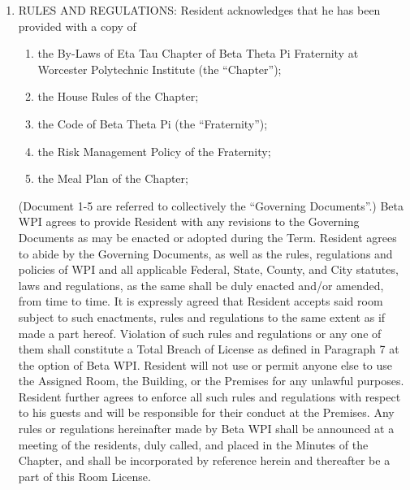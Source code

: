 \documentclass[legalpaper, 12pt]{article}
\begin{document}
\begin{enumerate}
\begin{enumerate}[label=\Alph*.]
                \end{enumerate}

        \item RULES AND REGULATIONS\@: Resident acknowledges that he has been
                provided with a copy of 

        \begin{enumerate}[label=\arabic*)]

                \item the By-Laws of Eta Tau Chapter of Beta Theta Pi Fraternity
                        at Worcester Polytechnic Institute (the ``Chapter''); 

                \item the House Rules of the Chapter; 

                \item the Code of Beta Theta Pi (the ``Fraternity'');

                \item the Risk Management Policy of the Fraternity;

                \item the Meal Plan of the Chapter;

        \end{enumerate}

                (Document 1-5 are referred to collectively the ``Governing
                Documents''.) Beta WPI agrees to provide Resident with any
                revisions to the Governing Documents as may be enacted or
                adopted during the Term.  Resident agrees to abide by the
                Governing Documents, as well as the rules, regulations and
                policies of WPI and all applicable Federal, State, County, and
                City statutes, laws and regulations, as the same shall be duly
                enacted and/or amended, from time to time.  It is expressly
                agreed that Resident accepts said room subject to such
                enactments, rules and regulations to the same extent as if made
                a part hereof.  Violation of such rules and regulations or any
                one of them shall constitute a Total Breach of License as
                defined in Paragraph 7 at the option of Beta WPI\@.  Resident
                will not use or permit anyone else to use the Assigned Room, the
                Building, or the Premises for any unlawful purposes.  Resident
                further agrees to enforce all such rules and regulations with
                respect to his guests and will be responsible for their conduct
                at the Premises.  Any rules or regulations hereinafter made by
                Beta WPI shall be announced at a meeting of the residents, duly
                called, and placed in the Minutes of the Chapter, and shall be
                incorporated by reference herein and thereafter be a part of
                this Room License.


\end{enumerate}
\end{document}
